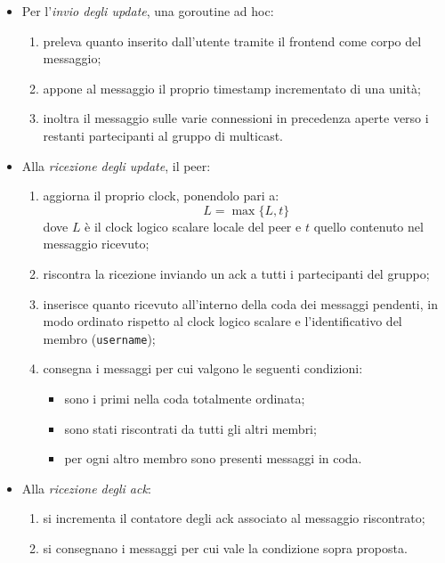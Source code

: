 \documentclass[conference]{IEEEtran}
\begin{document}
\begin{itemize}
\item Per l'\textsl{invio degli update}, una goroutine ad hoc:
\begin{enumerate}
\item preleva quanto inserito dall'utente tramite il frontend come corpo del messaggio;
\item appone al messaggio il proprio timestamp incrementato di una unità;
\item inoltra il messaggio sulle varie connessioni in precedenza aperte verso i restanti partecipanti al gruppo di multicast.
\end{enumerate}


\item Alla \textsl{ricezione degli update}, il peer:
\begin{enumerate}
\item aggiorna il proprio clock, ponendolo pari a:
\begin{equation}
L = \max\lbrace L, t \rbrace
\end{equation}
dove $L$ è il clock logico scalare locale del peer e $t$ quello contenuto nel messaggio ricevuto;
\item riscontra la ricezione inviando un ack a tutti i partecipanti del gruppo;
\item inserisce quanto ricevuto all'interno della coda dei messaggi pendenti, in modo ordinato rispetto al clock logico scalare e l'identificativo del membro (\texttt{username});
\item consegna i messaggi per cui valgono le seguenti condizioni:
\begin{itemize}
\item sono i primi nella coda totalmente ordinata;
\item sono stati riscontrati da tutti gli altri membri;
\item per ogni altro membro sono presenti messaggi in coda.
\end{itemize}
\end{enumerate}

\item Alla \textsl{ricezione degli ack}:
\begin{enumerate}
\item si incrementa il contatore degli ack associato al messaggio riscontrato;
\item si consegnano i messaggi per cui vale la condizione sopra proposta.
\end{enumerate}
\end{itemize}
\end{document}
